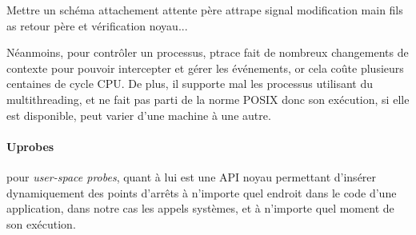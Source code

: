 {\color{red} Mettre un schéma attachement attente père attrape signal
  modification main fils as retour père et vérification noyau...}

Néanmoins, pour contrôler un processus, ptrace fait de nombreux changements de
contexte pour pouvoir intercepter et gérer les événements, or cela coûte
plusieurs centaines de cycle CPU. De plus, il supporte mal les processus
utilisant du multithreading, et ne fait pas parti de la norme POSIX donc son
exécution, si elle est disponible, peut varier d'une machine à une autre.

\paragraph{Uprobes}\citet{INTERCEPTION:AS, INTERCEPTION:MARION}



pour \textit{user-space probes}, quant à lui est une API noyau permettant
d'insérer dynamiquement des points d'arrêts à n'importe quel endroit dans le
code d'une application, dans notre cas les appels systèmes, et à n'importe quel
moment de son exécution.

